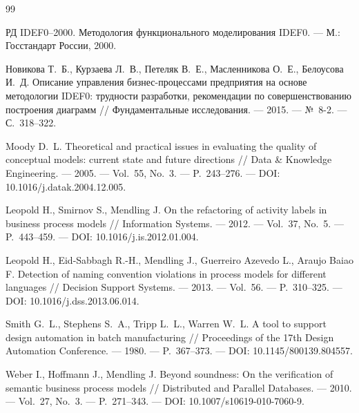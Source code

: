 
\begin{thebibliography}{99}

	РД IDEF0--2000. Методология функционального моделирования IDEF0. ---
	М.: Госстандарт России, 2000.

	Новикова Т.~Б., Курзаева Л.~В., Петеляк В.~Е.,
	Масленникова О.~Е., Белоусова И.~Д.
	Описание управления бизнес-процессами предприятия на основе методологии
	IDEF0: трудности разработки, рекомендации по совершенствованию
	построения диаграмм //
	Фундаментальные исследования. ---
	2015. ---
	№~8-2. ---
	С.~318--322.

	Moody D.~L.
	Theoretical and practical issues in evaluating the quality of
	conceptual models: current state and future directions //
	Data \& Knowledge Engineering. ---
	2005. ---
	Vol.~55, No.~3. ---
	P.~243--276. ---
	DOI: 10.1016/j.datak.2004.12.005.

	Leopold H., Smirnov S., Mendling J.
	On the refactoring of activity labels in business process models //
	Information Systems. ---
	2012. ---
	Vol.~37, No.~5. ---
	P.~443--459. ---
	DOI: 10.1016/j.is.2012.01.004.

	Leopold H., Eid-Sabbagh R.-H., Mendling J.,
	Guerreiro Azevedo L., Araujo Baiao F.
	Detection of naming convention violations in process models
	for different languages //
	Decision Support Systems. ---
	2013. ---
	Vol.~56. ---
	P.~310--325. ---
	DOI: 10.1016/j.dss.2013.06.014.

	Smith G.~L., Stephens S.~A., Tripp L.~L., Warren W.~L.
	A tool to support design automation in batch manufacturing //
	Proceedings of the 17th Design Automation Conference. ---
	1980. ---
	P.~367--373. ---
	DOI: 10.1145/800139.804557.

	Weber I., Hoffmann J., Mendling J.
	Beyond soundness: On the verification of semantic business
	process models //
	Distributed and Parallel Databases. ---
	2010. ---
	Vol.~27, No.~3. ---
	P.~271--343. ---
	DOI: 10.1007/s10619-010-7060-9.

\end{thebibliography}